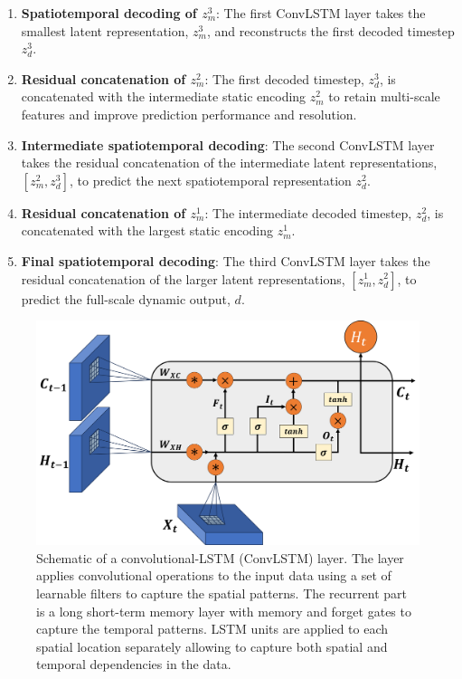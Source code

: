 \documentclass[10pt, twoside]{article}
\begin{document}
\begin{enumerate}[Step 1:]\addtocounter{enumi}{5}
    \item \textbf{Spatiotemporal decoding of $z_m^3$}: The first ConvLSTM layer takes the smallest latent representation, $z_m^3$, and reconstructs the first decoded timestep $z_d^3$.
    
    \item \textbf{Residual concatenation of $z_m^2$}: The first decoded timestep, $z_d^3$, is concatenated with the intermediate static encoding $z_m^2$ to retain multi-scale features and improve prediction performance and resolution.
    
    \item \textbf{Intermediate spatiotemporal decoding}: The second ConvLSTM layer takes the residual concatenation of the intermediate latent representations, $[z_m^2,z_d^3]$, to predict the next spatiotemporal representation $z_d^2$. 
    
    \item \textbf{Residual concatenation of $z_m^1$}: The intermediate decoded timestep, $z_d^2$, is concatenated with the largest static encoding $z_m^1$.
    
    \item \textbf{Final spatiotemporal decoding}: The third ConvLSTM layer takes the residual concatenation of the larger latent representations, $[z_m^1,z_d^2]$, to predict the full-scale dynamic output, $d$.
\end{enumerate}

\begin{figure}[h]
    \centering
    \includegraphics[width=12cm]{figures/convlstm.png}
    \caption{Schematic of a convolutional-LSTM (ConvLSTM) layer. The layer applies convolutional operations to the input data using a set of learnable filters to capture the spatial patterns. The recurrent part is a long short-term memory layer with memory and forget gates to capture the temporal patterns. LSTM units are applied to each spatial location separately allowing to capture both spatial and temporal dependencies in the data.}
    \label{convlstm}
\end{figure}
\end{document}
